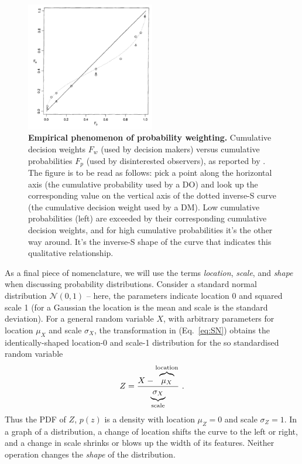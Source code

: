 \documentclass[a4paper, 12pt]{article}
\newcommand{\elabel}[1]{\label{eq:#1}}
\newcommand{\eref}[1]{(Eq.~\ref{eq:#1})}
\newcommand{\flabel}[1]{\label{fig:#1}}
\newcommand{\be}{\begin{equation}}
\newcommand{\ee}{\end{equation}}
\newcommand{\ND}{\mathcal{N}} %
\begin{document}
\begin{figure}[!htb]
\centering
\includegraphics[width=0.5\textwidth]{./figs/TK1992.PNG}
\caption{{\bf Empirical phenomenon of probability weighting.} Cumulative decision weights $F_w$ (used by decision makers) versus cumulative probabilities $F_p$ (used by disinterested observers), as reported by \cite[p.~310, Fig. 1]{TverskyKahneman1992}. The figure is to be read as follows: pick a point along the horizontal axis (the cumulative probability used by a DO) and look up the corresponding value on the vertical axis of the dotted inverse-S curve (the cumulative decision weight used by a DM). Low cumulative probabilities (left) are exceeded by their corresponding cumulative decision weights, and for high cumulative probabilities it's the other way around. It's the inverse-S shape of the curve that indicates this qualitative relationship.}
\flabel{TK1992}
\end{figure}

As a final piece of nomenclature, we will use the terms \textit{location}, \textit{scale}, and {\it shape} when discussing probability distributions. Consider a standard normal distribution $\ND(0,1)$ -- here, the parameters indicate location 0 and squared scale 1 (for a Gaussian the location is the mean and scale is the standard deviation). For a general random variable $X$, with arbitrary parameters for location $\mu_X$ and scale $\sigma_X$, the transformation in \eref{SN} obtains the identically-shaped location-0 and scale-1 distribution for the so standardised random variable
\be \elabel{SN}
	Z = \frac{X-\overbrace{\mu_X \mathstrut}^{\text{location}}}{\underbrace{\sigma_X\mathstrut}_{\text{scale}}}
~.
\ee
Thus the PDF of $Z$, $p(z)$ is a density with location $\mu_Z=0$ and scale $\sigma_Z=1$. In a graph of a distribution, a change of location shifts the curve to the left or right, and a change in scale shrinks or blows up the width of its features. Neither operation changes the {\it shape} of the distribution.
\end{document}
